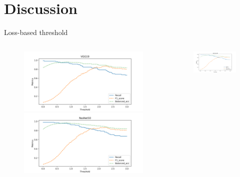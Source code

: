 \documentclass[aspectratio=169]{beamer}
\begin{document}
\section{Discussion}
\begin{frame}{Loss-based threshold}
    \begin{columns}
        \begin{column}{0.45\textwidth}
            \begin{figure}
                \centering
                \includegraphics[width=\columnwidth]{./results/comparison/VGG19_threshold.png}
                \includegraphics[width=\columnwidth]{./results/comparison/ResNet50_threshold.png}
            \end{figure}
        \end{column}
        \begin{column}{0.45\textwidth}
            \begin{figure}
                \centering
                \includegraphics[width=\columnwidth]{./results/comparison/VGG19_BN_threshold.png}

\end{figure}
\end{column}
\end{columns}
\end{frame}
\end{document}
